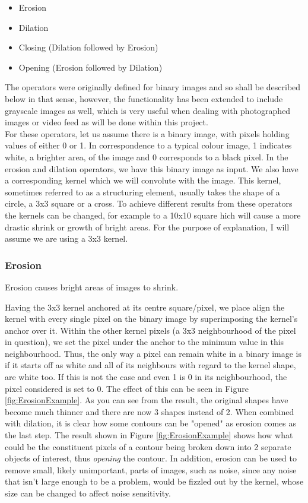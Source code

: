 \documentclass[11pt]{article}
\begin{document}
\begin{itemize}
	\item Erosion	
	\item Dilation
	\item Closing (Dilation followed by Erosion)
	\item Opening (Erosion followed by Dilation)
\end{itemize}

The operators were originally defined for binary images and so shall be 
described below in that sense, however, the functionality has been extended
to include grayscale images as well, which is very useful when dealing with
photographed images or video feed as will be done within this project.
\\
For these operators, let us assume there is a binary image, with pixels 
holding values of either 0 or 1. In correspondence to a typical colour image,
1 indicates white, a brighter area, of the image and 0 corresponds to a
black pixel. In the erosion and dilation operators, we have this binary
image as input. We also have a corresponding kernel which we will convolute
with the image. This kernel, sometimes referred to as a structuring element,
usually takes the shape of a circle, a 3x3 square or a cross. To achieve
different results from these operators the kernels can be changed, for example
to a 10x10 square hich will cause a more drastic shrink or growth of bright 
areas. For the purpose of explanation, I will assume we are using a 3x3 kernel.

\subsubsection{Erosion}
\begin{center}
Erosion causes bright areas of images to shrink.
\end{center}

Having the 3x3 kernel anchored at its centre square/pixel, we place align
the kernel with every single pixel on the binary image by superimposing
the kernel's anchor over it. Within the other kernel pixels (a 3x3 neighbourhood
of the pixel in question), we set the pixel under the anchor to the minimum 
value in this neighbourhood. Thus, the only way a pixel can remain white in
a binary image is if it starts off as white and all of its neighbours with 
regard to the kernel shape, are white too. If this is not the case and even 1
is 0 in its neighbourhood, the pixel considered is set to 0. The effect
of this can be seen in Figure \ref{fig:ErosionExample}. As you can see from 
the result, the original shapes have become much thinner and there are now
3 shapes instead of 2. When combined with dilation, it is clear how some contours
can be "opened" as erosion comes as the last step. The result shown in
Figure \ref{fig:ErosionExample} shows how what could be the constituent pixels
of a contour being broken down into 2 separate objects of interest, thus 
\textit{opening} the contour. In addition, erosion can be used to remove
small, likely unimportant, parts of images, such as noise, since any noise
that isn't large enough to be a problem, would be fizzled out by the kernel, 
whose size can be changed to affect noise sensitivity.\\
\end{document}
